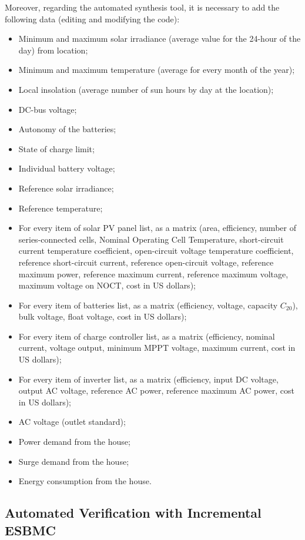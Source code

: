 Moreover, regarding the automated synthesis tool, it is necessary to add the following data (editing and modifying the code):

\begin{itemize}
\item Minimum and maximum solar irradiance (average value for the 24-hour of the day) from location;
\item Minimum and maximum temperature (average for every month of the year);
\item Local insolation (average number of sun hours by day at the location);
\item DC-bus voltage;
\item Autonomy of the batteries;
\item State of charge limit;
\item Individual battery voltage;
\item Reference solar irradiance;
\item Reference temperature;
\item For every item of solar PV panel list, as a matrix (area, efficiency, number of series-connected cells, Nominal Operating Cell Temperature, short-circuit current temperature coefficient, open-circuit voltage temperature coefficient, reference short-circuit current, reference open-circuit voltage, reference maximum power, reference maximum current, reference maximum voltage, maximum voltage on NOCT, cost in US dollars);
\item For every item of batteries list, as a matrix (efficiency, voltage, capacity $C_{20}$), bulk voltage, float voltage, cost in US dollars);
\item For every item of charge controller list, as a matrix (efficiency, nominal current, voltage output, minimum MPPT voltage, maximum current, cost in US dollars);
\item For every item of inverter list, as a matrix (efficiency, input DC voltage, output AC voltage, reference AC power, reference maximum AC power, cost in US dollars);
\item AC voltage (outlet standard);
\item Power demand from the house;
\item Surge demand from the house;
\item Energy consumption from the house.
\end{itemize}

\subsection{Automated Verification with Incremental ESBMC}

